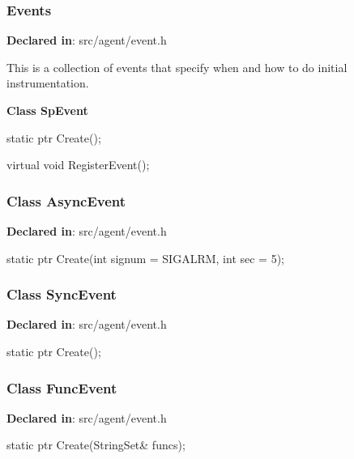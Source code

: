 \subsubsection{Events}
\textbf{Declared in}: src/agent/event.h

This is a collection of events that specify when and how to do initial
instrumentation.

\textbf{Class SpEvent}

\begin{apient}
static ptr Create();
\end{apient}

\begin{apient}
virtual void RegisterEvent();
\end{apient}
\apidesc{
}

\subsubsection{Class AsyncEvent}
\textbf{Declared in}: src/agent/event.h

\begin{apient}
static ptr Create(int signum = SIGALRM,
                  int sec = 5);
\end{apient}

\subsubsection{Class SyncEvent}
\textbf{Declared in}: src/agent/event.h

\begin{apient}
static ptr Create();
\end{apient}

\subsubsection{Class FuncEvent}
\textbf{Declared in}: src/agent/event.h

\begin{apient}
static ptr Create(StringSet& funcs);
\end{apient}

